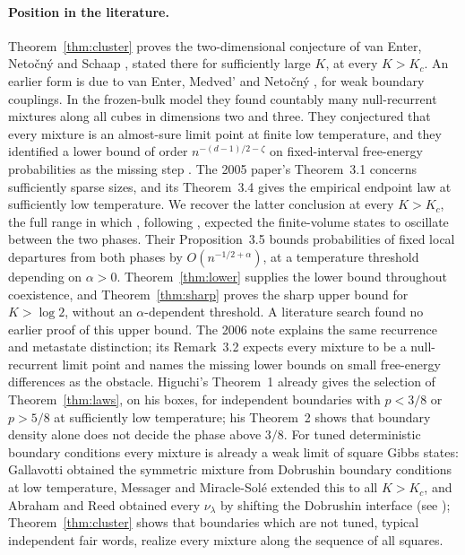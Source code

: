 \paragraph{Position in the literature.}
Theorem~\ref{thm:cluster} proves the two-dimensional conjecture of van Enter, Neto\v cn\'y and Schaap \cite[Remark~3.2]{vENS05}, stated there for sufficiently large $K$, at every $K>K_c$. An earlier form is due to van Enter, Medved' and Neto\v cn\'y \cite{EMN02}, for weak boundary couplings. In the frozen-bulk model they found countably many null-recurrent mixtures along all cubes in dimensions two and three. They conjectured that every mixture is an almost-sure limit point at finite low temperature, and they identified a lower bound of order $n^{-(d-1)/2-\zeta}$ on fixed-interval free-energy probabilities as the missing step \cite[Sections~1 and~6]{EMN02}. The 2005 paper's Theorem~3.1 concerns sufficiently sparse sizes, and its Theorem~3.4 gives the empirical endpoint law at sufficiently low temperature. We recover the latter conclusion at every $K>K_c$, the full range in which \cite[Section~1]{vENS05}, following \cite{NS92}, expected the finite-volume states to oscillate between the two phases. Their Proposition~3.5 bounds probabilities of fixed local departures from both phases by $O(n^{-1/2+\alpha})$, at a temperature threshold depending on $\alpha>0$. Theorem~\ref{thm:lower} supplies the lower bound throughout coexistence, and Theorem~\ref{thm:sharp} proves the sharp upper bound for $K>\log2$, without an $\alpha$-dependent threshold. A literature search found no earlier proof of this upper bound. The 2006 note \cite[Section~3]{vENS06} explains the same recurrence and metastate distinction; its Remark~3.2 expects every mixture to be a null-recurrent limit point and names the missing lower bounds on small free-energy differences as the obstacle. Higuchi's Theorem~1 \cite{Higuchi78} already gives the selection of Theorem~\ref{thm:laws}, on his boxes, for independent boundaries with $p<3/8$ or $p>5/8$ at sufficiently low temperature; his Theorem~2 shows that boundary density alone does not decide the phase above $3/8$. For tuned deterministic boundary conditions every mixture is already a weak limit of square Gibbs states: Gallavotti \cite{Gallavotti72} obtained the symmetric mixture from Dobrushin boundary conditions at low temperature, Messager and Miracle-Sol\'e \cite{MMS77} extended this to all $K>K_c$, and Abraham and Reed \cite{AbrahamReed76} obtained every $\nu_\lambda$ by shifting the Dobrushin interface (see \cite[Section~1.1.1]{Coquille15}); Theorem~\ref{thm:cluster} shows that boundaries which are not tuned, typical independent fair words, realize every mixture along the sequence of all squares.

